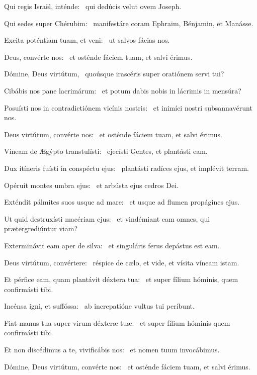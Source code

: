 \item Qui regis Israël, inténde:~\psstar{} qui dedúcis velut ovem Joseph.

\item Qui sedes super Chérubim:~\psstar{} manifestáre coram Ephraim, Bénjamin, et Manásse.

\item Excita poténtiam tuam, et veni:~\psstar{} ut salvos fácias nos.

\item Deus, convérte nos:~\psstar{} et osténde fáciem tuam, et salvi érimus.

\item Dómine, Deus virtútum,~\psstar{} quoúsque irascéris super oratiónem servi tui?

\item Cibábis nos pane lacrimárum:~\psstar{} et potum dabis nobis in lácrimis in mensúra?

\item Posuísti nos in contradictiónem vicínis nostris:~\psstar{} et inimíci nostri subsannavérunt nos.

\item Deus virtútum, convérte nos:~\psstar{} et osténde fáciem tuam, et salvi érimus.

\item Víneam de Ægýpto transtulísti:~\psstar{} ejecísti Gentes, et plantásti eam.

\item Dux itíneris fuísti in conspéctu ejus:~\psstar{} plantásti radíces ejus, et implévit terram.

\item Opéruit montes umbra ejus:~\psstar{} et arbústa ejus cedros Dei.

\item Exténdit pálmites suos usque ad mare:~\psstar{} et usque ad flumen propágines ejus.

\item Ut quid destruxísti macériam ejus:~\psstar{} et vindémiant eam omnes, qui prætergrediúntur viam?

\item Exterminávit eam aper de silva:~\psstar{} et singuláris ferus depástus est eam.

\item Deus virtútum, convértere:~\psstar{} réspice de cælo, et vide, et vísita víneam istam.

\item Et pérfice eam, quam plantávit déxtera tua:~\psstar{} et super fílium hóminis, quem confirmásti tibi.

\item Incénsa igni, et suffóssa:~\psstar{} ab increpatióne vultus tui períbunt.

\item Fiat manus tua super virum déxteræ tuæ:~\psstar{} et super fílium hóminis quem confirmásti tibi.

\item Et non discédimus a te, vivificábis nos:~\psstar{} et nomen tuum invocábimus.

\item Dómine, Deus virtútum, convérte nos:~\psstar{} et osténde fáciem tuam, et salvi érimus.